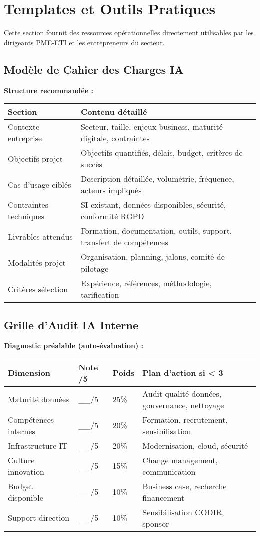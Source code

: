 \section{Templates et Outils Pratiques}

Cette section fournit des ressources opérationnelles directement utilisables par les dirigeants PME-ETI et les entrepreneurs du secteur.

\subsection{Modèle de Cahier des Charges IA}

\textbf{Structure recommandée :}

\begin{longtable}{@{}p{3cm}p{11cm}@{}}
\toprule
\textbf{Section} & \textbf{Contenu détaillé} \\
\midrule
Contexte entreprise & Secteur, taille, enjeux business, maturité digitale, contraintes \\
Objectifs projet & Objectifs quantifiés, délais, budget, critères de succès \\
Cas d'usage ciblés & Description détaillée, volumétrie, fréquence, acteurs impliqués \\
Contraintes techniques & SI existant, données disponibles, sécurité, conformité RGPD \\
Livrables attendus & Formation, documentation, outils, support, transfert de compétences \\
Modalités projet & Organisation, planning, jalons, comité de pilotage \\
Critères sélection & Expérience, références, méthodologie, tarification \\
\bottomrule
\end{longtable}

\subsection{Grille d'Audit IA Interne}

\textbf{Diagnostic préalable (auto-évaluation) :}

\begin{longtable}{@{}p{4cm}p{2cm}p{2cm}p{6cm}@{}}
\toprule
\textbf{Dimension} & \textbf{Note /5} & \textbf{Poids} & \textbf{Plan d'action si < 3} \\
\midrule
Maturité données & \_\_/5 & 25\% & Audit qualité données, gouvernance, nettoyage \\
Compétences internes & \_\_/5 & 20\% & Formation, recrutement, sensibilisation \\
Infrastructure IT & \_\_/5 & 20\% & Modernisation, cloud, sécurité \\
Culture innovation & \_\_/5 & 15\% & Change management, communication \\
Budget disponible & \_\_/5 & 10\% & Business case, recherche financement \\
Support direction & \_\_/5 & 10\% & Sensibilisation CODIR, sponsor \\
\bottomrule
\end{longtable}

